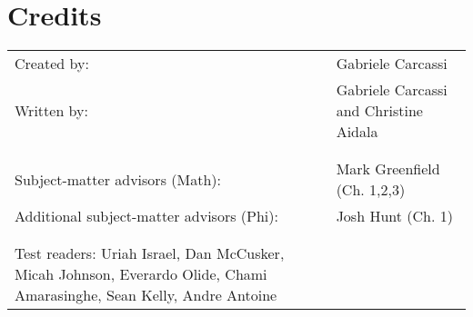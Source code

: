 \documentclass[11pt,letterpaper,fleqn]{memoir} %
\begin{document}
\chapter[Credits]{\centering Credits}

\begin{table}[h]
\centering
\begin{tabular}{R{0.45\textwidth} L{0.5\textwidth}}
Created by: & Gabriele Carcassi \\
Written by: & Gabriele Carcassi and Christine Aidala \\
& \\
& \\
Subject-matter advisors (Math): & Mark Greenfield (Ch. 1,2,3) \\
Additional subject-matter advisors (Phi): & Josh Hunt (Ch. 1) \\
& \\
& \\
Test readers: Uriah Israel, Dan McCusker, Micah Johnson, Everardo Olide, Chami Amarasinghe, Sean Kelly, Andre Antoine




\end{tabular} 
\end{table}


	
\end{document}
